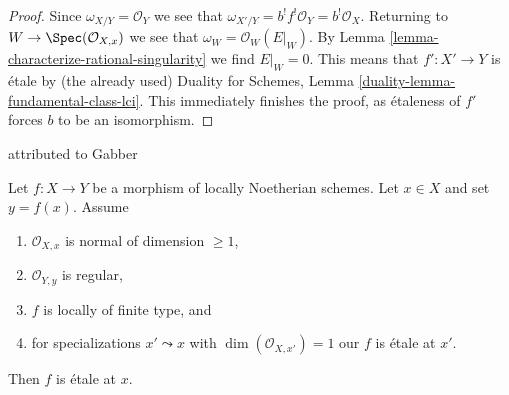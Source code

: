 \begin{proof}
\medskip\noindent
Since $\omega_{X/Y} = \mathcal{O}_Y$ we see that
$\omega_{X'/Y} = b^! f^!\mathcal{O}_Y = b^!\mathcal{O}_X$.
Returning to $W \to \Spec(\mathcal{O}_{X, x})$
we see that $\omega_W = \mathcal{O}_W(E|_W)$.
By Lemma \ref{lemma-characterize-rational-singularity}
we find $E|_W = 0$.
This means that $f' : X' \to Y$ is \'etale by (the already used)
Duality for Schemes, Lemma \ref{duality-lemma-fundamental-class-lci}.
This immediately finishes the proof, as \'etaleness
of $f'$ forces $b$ to be an isomorphism.
\end{proof}

\begin{lemma}
\label{lemma-purity-ramification}
\begin{reference}
\cite[Theorem 2.4]{Zong} attributed to Gabber
\end{reference}
Let $f : X \to Y$ be a morphism of locally Noetherian schemes.
Let $x \in X$ and set $y = f(x)$. Assume
\begin{enumerate}
\item $\mathcal{O}_{X, x}$ is normal of dimension $\geq 1$,
\item $\mathcal{O}_{Y, y}$ is regular,
\item $f$ is locally of finite type, and
\item for specializations $x' \leadsto x$ with
$\dim(\mathcal{O}_{X, x'}) = 1$ our $f$ is \'etale at $x'$.
\end{enumerate}
Then $f$ is \'etale at $x$.
\end{lemma}

